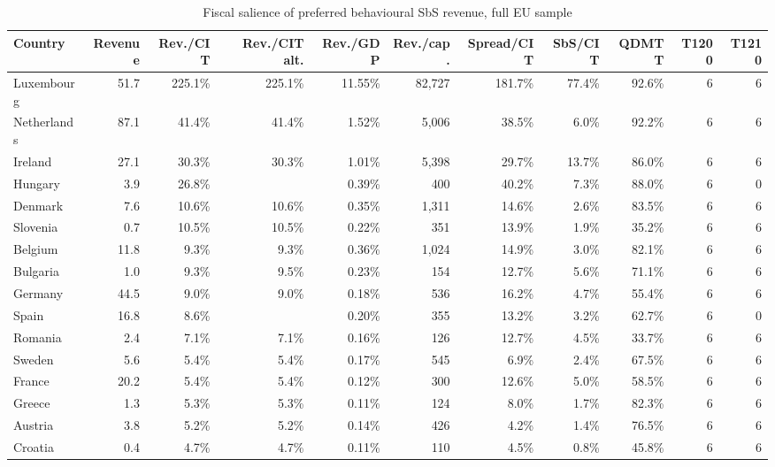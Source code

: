 \begin{table}[H]
\centering
\footnotesize
\setlength{\tabcolsep}{3pt}
\caption{Fiscal salience of preferred behavioural SbS revenue, full EU sample}
\label{tab:app_country_fiscal_salience_full}
\begin{tabular}{@{}lrrrrrrrrrr@{}}
\toprule
Country & Revenue & Rev./CIT & Rev./CIT alt. & Rev./GDP & Rev./cap. & Spread/CIT & SbS/CIT & QDMTT & T1200 & T1210 \\
\midrule
Luxembourg & 51.7 & 225.1\% & 225.1\% & 11.55\% & 82,727 & 181.7\% & 77.4\% &  92.6\% & 6 & 6 \\
Netherlands & 87.1 &  41.4\% &  41.4\% &  1.52\% &  5,006 &  38.5\% &  6.0\% &  92.2\% & 6 & 6 \\
Ireland & 27.1 &  30.3\% &  30.3\% &  1.01\% &  5,398 &  29.7\% & 13.7\% &  86.0\% & 6 & 6 \\
Hungary &  3.9 &  26.8\% &  &  0.39\% &    400 &  40.2\% &  7.3\% &  88.0\% & 6 & 0 \\
Denmark &  7.6 &  10.6\% &  10.6\% &  0.35\% &  1,311 &  14.6\% &  2.6\% &  83.5\% & 6 & 6 \\
Slovenia &  0.7 &  10.5\% &  10.5\% &  0.22\% &    351 &  13.9\% &  1.9\% &  35.2\% & 6 & 6 \\
Belgium & 11.8 &   9.3\% &   9.3\% &  0.36\% &  1,024 &  14.9\% &  3.0\% &  82.1\% & 6 & 6 \\
Bulgaria &  1.0 &   9.3\% &   9.5\% &  0.23\% &    154 &  12.7\% &  5.6\% &  71.1\% & 6 & 6 \\
Germany & 44.5 &   9.0\% &   9.0\% &  0.18\% &    536 &  16.2\% &  4.7\% &  55.4\% & 6 & 6 \\
Spain & 16.8 &   8.6\% &  &  0.20\% &    355 &  13.2\% &  3.2\% &  62.7\% & 6 & 0 \\
Romania &  2.4 &   7.1\% &   7.1\% &  0.16\% &    126 &  12.7\% &  4.5\% &  33.7\% & 6 & 6 \\
Sweden &  5.6 &   5.4\% &   5.4\% &  0.17\% &    545 &   6.9\% &  2.4\% &  67.5\% & 6 & 6 \\
France & 20.2 &   5.4\% &   5.4\% &  0.12\% &    300 &  12.6\% &  5.0\% &  58.5\% & 6 & 6 \\
Greece &  1.3 &   5.3\% &   5.3\% &  0.11\% &    124 &   8.0\% &  1.7\% &  82.3\% & 6 & 6 \\
Austria &  3.8 &   5.2\% &   5.2\% &  0.14\% &    426 &   4.2\% &  1.4\% &  76.5\% & 6 & 6 \\
Croatia &  0.4 &   4.7\% &   4.7\% &  0.11\% &    110 &   4.5\% &  0.8\% &  45.8\% & 6 & 6 \\

\end{tabular}
\end{table}
